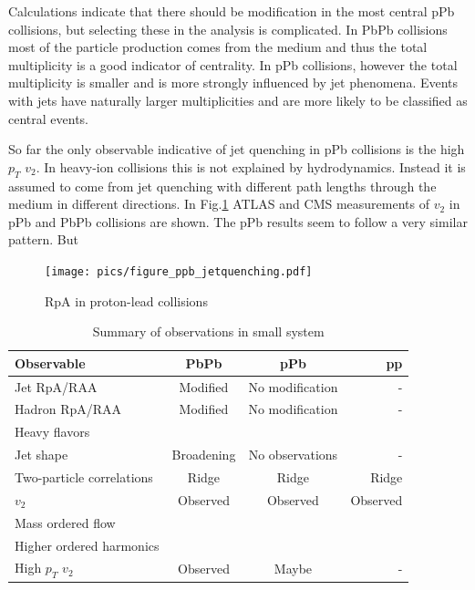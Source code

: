 Calculations indicate that there should be modification in the most central pPb collisions, but selecting these in the analysis is complicated. In PbPb collisions most of the particle production comes from the medium and thus the total multiplicity is a good indicator of centrality. In pPb collisions, however the total multiplicity is smaller and is more strongly influenced by jet phenomena. Events with jets have naturally larger multiplicities and are more likely to be classified as central events.

So far the only observable indicative of jet quenching in pPb collisions is the high $p_T$ $v_2$. In heavy-ion collisions this is not explained by hydrodynamics. Instead it is assumed to come from jet quenching with different path lengths through the medium in different directions. In Fig.\ref{fig:smallsystems3} ATLAS and CMS measurements of $v_2$ in pPb and PbPb collisions are shown. The pPb results seem to follow a very similar pattern. But 


\begin{figure}[b!]
\centering
            	\texttt{[image: pics/figure\_ppb\_jetquenching.pdf]}
                \caption{RpA in proton-lead collisions}
	\label{fig:smallsystems3}
\end{figure}


\begin{table}[htb]
\centering
\caption{Summary of observations in small system}
\label{tab:systematics}
\begin{tabular}{ l | c | c | r }
  Observable & PbPb & pPb & pp \\
    \hline			
  Jet RpA/RAA & Modified & No modification &  - \\
  Hadron RpA/RAA & Modified & No modification &  -\\
  Heavy flavors & & & \\
  Jet shape & Broadening & No observations & - \\
  Two-particle correlations & Ridge & Ridge & Ridge  \\
  $v_2$ & Observed & Observed & Observed \\
  Mass ordered flow & & & \\
  Higher ordered harmonics & &  &\\
  High $p_T$ $v_2$ & Observed & Maybe & - \\
  \hline
  \end{tabular}
  \end{table}

